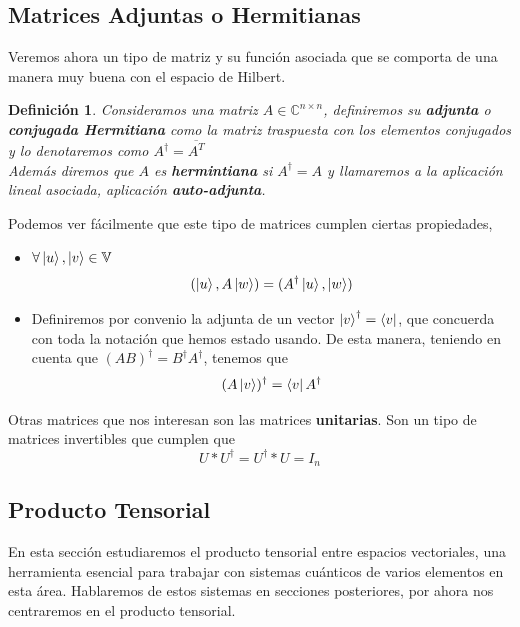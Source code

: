 \documentclass[a4paper]{article}
\newtheorem{deff}{Definición}[section]
\numberwithin{equation}{section}
\begin{document}
\subsection{Matrices Adjuntas o Hermitianas}
Veremos ahora un tipo de matriz y su función asociada que se comporta de una manera muy buena con el espacio de Hilbert.

\begin{deff}Consideramos una matriz $A \in \mathbb{C}^{n\times n}$, definiremos su \textbf{adjunta} o \textbf{conjugada Hermitiana} como la matriz traspuesta con los elementos conjugados y lo denotaremos como $A^\dagger = \overline{A^T}$
\\
Además diremos que $A$ es \textbf{hermintiana} si $A^\dagger = A$ y llamaremos a la aplicación lineal asociada, aplicación \textbf{auto-adjunta}.

\end{deff}
Podemos ver fácilmente que este tipo de matrices cumplen ciertas propiedades,
\begin{itemize}

\item $\forall \ket{u}, \ket{v} \in \mathbb{V}$
\begin{equation}
(\ket{u}, A \ket{w}) = (A^\dagger \ket{u},\ket{w})
\end{equation}

\item Definiremos por convenio la adjunta de un vector $\ket{v}^\dagger = \bra{v}$, que concuerda con toda la notación que hemos estado usando. De esta manera, teniendo en cuenta que $(AB)^\dagger = B^\dagger A^\dagger$, tenemos que
\begin{equation}
(A\ket{v})^\dagger = \bra{v}A^\dagger
\end{equation}
\end{itemize}
Otras matrices que nos interesan son las matrices \textbf{unitarias}. Son un tipo de matrices invertibles que cumplen que
\begin{equation}
U * U^\dagger = U^\dagger * U = I_n
\end{equation}

\subsection{Producto Tensorial}

En esta sección estudiaremos el producto tensorial entre espacios vectoriales, una herramienta esencial para trabajar con sistemas cuánticos de varios elementos en esta área. Hablaremos de estos sistemas en secciones posteriores, por ahora nos centraremos en el producto tensorial.
\end{document}
